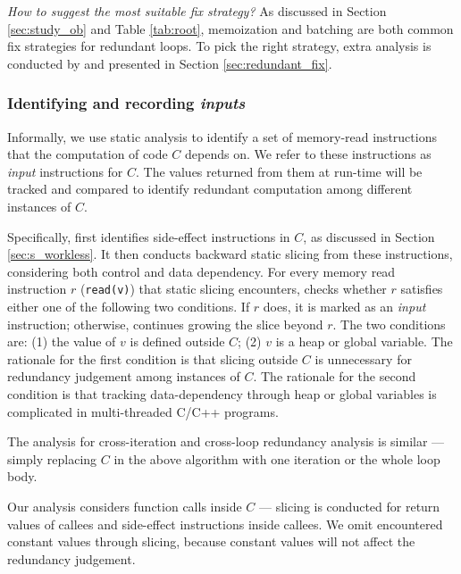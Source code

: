 \emph{How to suggest the most suitable fix strategy?}
As discussed in Section \ref{sec:study_ob} and Table \ref{tab:root},
memoization and batching are both common fix strategies for redundant loops.
To pick the right strategy,
extra analysis is conducted by \Tool and presented in 
Section \ref{sec:redundant_fix}.

\subsubsection{Identifying and recording \textit{inputs}}
\label{sec:dependence}

Informally, we use static analysis to identify a set of 
memory-read instructions that the computation of code $C$
depends on. We refer
to these instructions as \textit{input} instructions for $C$. 
The values returned
from them at run-time will be tracked and compared to identify
redundant computation among different instances of $C$.

Specifically, \Tool first identifies side-effect instructions in $C$,
as 
discussed in Section \ref{sec:s_workless}. 
It then conducts 
backward static slicing 
from these instructions, considering both control and data
dependency. For every memory read instruction $r$ 
(\texttt{read(v)}) that static slicing encounters, \Tool checks whether $r$
satisfies either one of the following two conditions. 
If $r$ does, it is marked as
an \textit{input} instruction; otherwise, \Tool continues growing the
slice beyond $r$.
The two conditions are:
(1) the value of $v$ is defined outside $C$;
(2) $v$ is a heap or global variable.
The rationale for the first condition is that slicing outside $C$ is
unnecessary for redundancy judgement among instances of $C$.
The rationale for the second condition is that tracking data-dependency
through heap or global variables is complicated in multi-threaded C/C++
programs.

The analysis for cross-iteration and cross-loop redundancy analysis is similar
--- simply replacing $C$ in the above algorithm with one iteration or
the whole loop body.


Our analysis considers function calls inside $C$ --- slicing is conducted
for return values of callees and side-effect instructions
inside callees. 
We omit encountered constant values through slicing, because constant values will not affect the redundancy judgement. 

